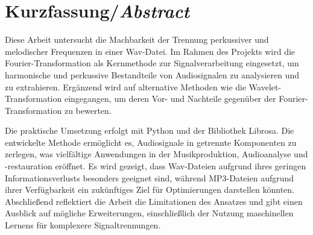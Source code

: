 \chapter*{Kurzfassung/\emph{Abstract}}
\label{chap:abstract}
%

Diese Arbeit untersucht die Machbarkeit der Trennung perkussiver und melodischer Frequenzen in einer Wav-Datei.
Im Rahmen des Projekts wird die Fourier-Transformation als Kernmethode zur Signalverarbeitung eingesetzt, um harmonische und perkussive Bestandteile von Audiosignalen zu analysieren und zu extrahieren.
Ergänzend wird auf alternative Methoden wie die Wavelet-Transformation eingegangen, um deren Vor- und Nachteile gegenüber der Fourier-Transformation zu bewerten.

\par

Die praktische Umsetzung erfolgt mit Python und der Bibliothek Librosa.
Die entwickelte Methode ermöglicht es, Audiosignale in getrennte Komponenten zu zerlegen, was vielfältige Anwendungen in der Musikproduktion, Audioanalyse und -restauration eröffnet.
Es wird gezeigt, dass Wav-Dateien aufgrund ihres geringen Informationsverlusts besonders geeignet sind, während MP3-Dateien aufgrund ihrer Verfügbarkeit ein zukünftiges Ziel für Optimierungen darstellen könnten.
Abschließend reflektiert die Arbeit die Limitationen des Ansatzes und gibt einen Ausblick auf mögliche Erweiterungen, einschließlich der Nutzung maschinellen Lernens für komplexere Signaltrennungen.